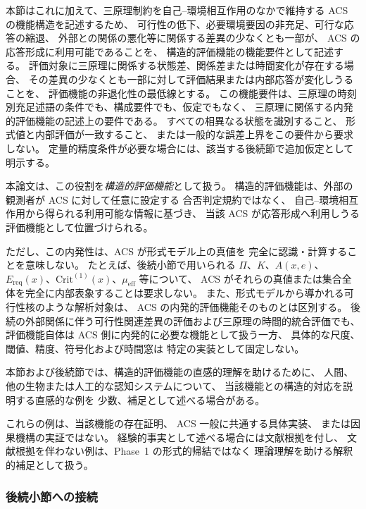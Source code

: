 本節はこれに加えて、三原理制約を自己--環境相互作用のなかで維持する
ACS の機能構造を記述するため、
可行性の低下、必要環境要因の非充足、可行な応答の縮退、
外部との関係の悪化等に関係する差異の少なくとも一部が、
ACS の応答形成に利用可能であることを、
構造的評価機能の機能要件として記述する。
評価対象に三原理に関係する状態差、関係差または時間変化が存在する場合、
その差異の少なくとも一部に対して評価結果または内部応答が変化しうることを、
評価機能の非退化性の最低線とする。
この機能要件は、三原理の時刻別充足述語の条件でも、構成要件でも、仮定でもなく、
三原理に関係する内発的評価機能の記述上の要件である。
すべての相異なる状態を識別すること、
形式値と内部評価が一致すること、
または一般的な誤差上界をこの要件から要求しない。
定量的精度条件が必要な場合には、該当する後続節で追加仮定として明示する。

本論文は、この役割を\emph{構造的評価機能}として扱う。
構造的評価機能は、外部の観測者が ACS に対して任意に設定する
合否判定規約ではなく、
自己--環境相互作用から得られる利用可能な情報に基づき、
当該 ACS が応答形成へ利用しうる評価機能として位置づけられる。

ただし、この内発性は、ACS が形式モデル上の真値を
完全に認識・計算することを意味しない。
たとえば、後続小節で用いられる $\Pi$、$K$、$A(x,e)$、
$E_{\mathrm{req}}(x)$、$\mathrm{Crit}^{(1)}(x)$、$\mu_{\mathrm{eff}}$ 等について、
ACS がそれらの真値または集合全体を完全に内部表象することは要求しない。
また、形式モデルから導かれる可行性核のような解析対象は、
ACS の内発的評価機能そのものとは区別する。
後続の外部関係に伴う可行性関連差異の評価および三原理の時間的統合評価でも、
評価機能自体は ACS 側に内発的に必要な機能として扱う一方、
具体的な尺度、閾値、精度、符号化および時間窓は
特定の実装として固定しない。

\begin{remark}[例示の地位]
\label{rem:example_status}
本節および後続節では、構造的評価機能の直感的理解を助けるために、
人間、他の生物または人工的な認知システムについて、
当該機能との構造的対応を説明する直感的な例を
少数、補足として述べる場合がある。

これらの例は、当該機能の存在証明、
ACS 一般に共通する具体実装、
または因果機構の実証ではない。
経験的事実として述べる場合には文献根拠を付し、
文献根拠を伴わない例は、Phase~1 の形式的帰結ではなく
理論理解を助ける解釈的補足として扱う。
\end{remark}

\subsubsection{後続小節への接続}

